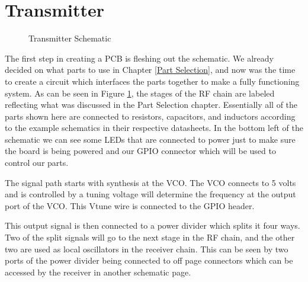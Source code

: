 \section{Transmitter}
\begin{figure}[H]
  \centering
\caption{Transmitter Schematic}
\label{img:transmitterfull}
\end{figure}
The first step in creating a PCB is fleshing out the schematic. We already decided on what parts to use in Chapter \ref{Part Selection},
and now was the time to create a circuit which interfaces the parts together to make a fully functioning system.
As can be seen in Figure \ref{img:transmitterfull}, the stages of the RF chain are labeled reflecting what was discussed in the
Part Selection chapter. Essentially all of the parts shown here are connected to resistors, capacitors, and inductors according
to the example schematics in their respective datasheets. In the bottom left of the schematic we can see some LEDs
that are connected to power just to make sure the board is being powered and our GPIO connector which will be used to control our
parts. 

The signal path starts with synthesis at the VCO. The VCO connects to 5 volts and is controlled by a tuning voltage will
determine the frequency at the output port of the VCO. This Vtune wire is connected to the GPIO header.

This output signal is then connected to a power divider which splits it four ways. Two of the split signals will
go to the next stage in the RF chain, and the other two are used as local oscillators in the receiver chain. 
This can be seen by two ports of the power divider being connected to off page connectors which can be accessed by the
receiver in another schematic page.

